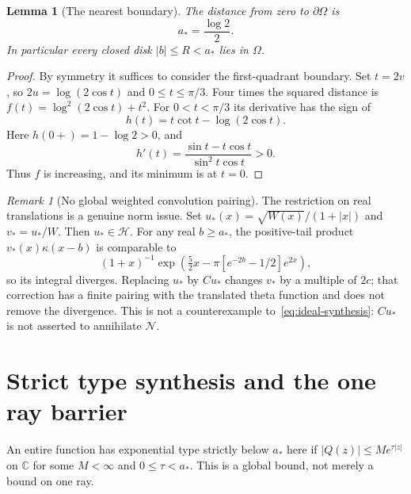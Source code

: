 \documentclass[11pt,a4paper]{article}
\numberwithin{equation}{section}
\newtheorem{lemma}[theorem]{Lemma}
\theoremstyle{definition}
\theoremstyle{remark}
\newtheorem{remark}[theorem]{Remark}
\newcommand{\C}{\mathbb C}
\newcommand{\Hh}{\mathcal H}
\newcommand{\Nn}{\mathcal N}
\begin{document}
\begin{lemma}[The nearest boundary]\label{lem:radius}
The distance from zero to $\partial\Omega$ is
\begin{equation}\label{eq:a-star}
 a_*=\frac{\log2}{2}.
\end{equation}
In particular every closed disk $|b|\le R<a_*$ lies in $\Omega$.
\end{lemma}
\begin{proof}
By symmetry it suffices to consider the first-quadrant boundary. Set $t=2v$, so $2u=\log(2\cos t)$ and $0\le t\le\pi/3$. Four times the squared distance is
$f(t)=\log^2(2\cos t)+t^2$. For $0<t<\pi/3$ its derivative has the sign of
\[
 h(t)=t\cot t-\log(2\cos t).
\]
Here $h(0+)=1-\log2>0$, and
\[
 h'(t)=\frac{\sin t-t\cos t}{\sin^2t\cos t}>0.
\]
Thus $f$ is increasing, and its minimum is at $t=0$.
\end{proof}

\begin{remark}[No global weighted convolution pairing]\label{rem:pairing}
The restriction on real translations is a genuine norm issue. Set
$u_*(x)=\sqrt{W(x)}/(1+|x|)$ and $v_*=u_*/W$. Then $u_*\in\Hh$. For any real $b\ge a_*$, the positive-tail product $v_*(x)\kappa(x-b)$ is comparable to
\[
 (1+x)^{-1}\exp\!\left(\tfrac52x-\pi[e^{-2b}-1/2]e^{2x}\right),
\]
so its integral diverges. Replacing $u_*$ by $Cu_*$ changes $v_*$ by a multiple of $2c$; that correction has a finite pairing with the translated theta function and does not remove the divergence. This is not a counterexample to~\eqref{eq:ideal-synthesis}: $Cu_*$ is not asserted to annihilate $\Nn$.
\end{remark}

\section{Strict type synthesis and the one ray barrier}\label{sec:type}

An entire function has exponential type strictly below $a_*$ here if
$|Q(z)|\le M e^{\tau|z|}$ on $\C$ for some $M<\infty$ and $0\le\tau<a_*$. This is a global bound, not merely a bound on one ray.
\end{document}
